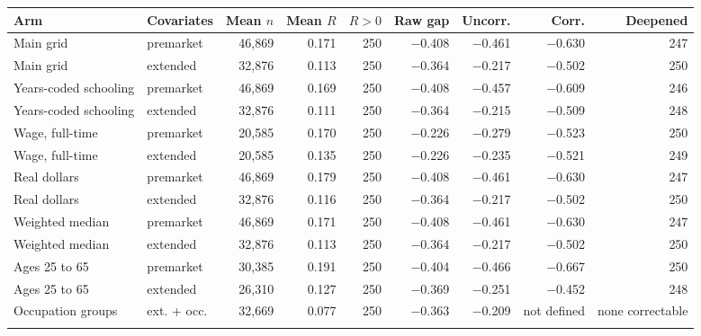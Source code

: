 \setlength{\tabcolsep}{2.5pt}
\begin{tabular}{@{}llrrrrrrr@{}}
\toprule
Arm & Covariates & Mean $n$ & Mean $R$ & $R>0$ & Raw gap & Uncorr. & Corr. & Deepened\\
\midrule
Main grid & premarket & 46,869 & 0.171 & 250 & $-$0.408 & $-$0.461 & $-$0.630 & 247\\
Main grid & extended & 32,876 & 0.113 & 250 & $-$0.364 & $-$0.217 & $-$0.502 & 250\\
Years-coded schooling & premarket & 46,869 & 0.169 & 250 & $-$0.408 & $-$0.457 & $-$0.609 & 246\\
Years-coded schooling & extended & 32,876 & 0.111 & 250 & $-$0.364 & $-$0.215 & $-$0.509 & 248\\
Wage, full-time & premarket & 20,585 & 0.170 & 250 & $-$0.226 & $-$0.279 & $-$0.523 & 250\\
Wage, full-time & extended & 20,585 & 0.135 & 250 & $-$0.226 & $-$0.235 & $-$0.521 & 249\\
Real dollars & premarket & 46,869 & 0.179 & 250 & $-$0.408 & $-$0.461 & $-$0.630 & 247\\
Real dollars & extended & 32,876 & 0.116 & 250 & $-$0.364 & $-$0.217 & $-$0.502 & 250\\
Weighted median & premarket & 46,869 & 0.171 & 250 & $-$0.408 & $-$0.461 & $-$0.630 & 247\\
Weighted median & extended & 32,876 & 0.113 & 250 & $-$0.364 & $-$0.217 & $-$0.502 & 250\\
Ages 25 to 65 & premarket & 30,385 & 0.191 & 250 & $-$0.404 & $-$0.466 & $-$0.667 & 250\\
Ages 25 to 65 & extended & 26,310 & 0.127 & 250 & $-$0.369 & $-$0.251 & $-$0.452 & 248\\
Occupation groups & ext. + occ. & 32,669 & 0.077 & 250 & $-$0.363 & $-$0.209 & not defined & none correctable\\
\botrule
\end{tabular}
